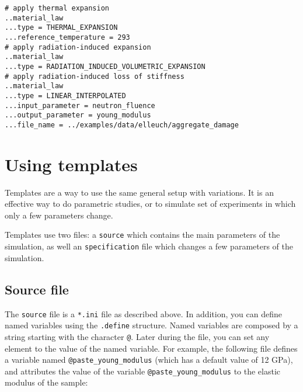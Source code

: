 \documentclass[10pt]{article}
\begin{document}
\verb+# apply thermal expansion+\\
\verb+..material_law+\\
\verb+...type = THERMAL_EXPANSION+\\
\verb+...reference_temperature = 293+\\
\verb+# apply radiation-induced expansion+\\
\verb+..material_law+\\
\verb+...type = RADIATION_INDUCED_VOLUMETRIC_EXPANSION+\\
\verb+# apply radiation-induced loss of stiffness+\\
\verb+..material_law+\\
\verb+...type = LINEAR_INTERPOLATED+\\
\verb+...input_parameter = neutron_fluence+\\
\verb+...output_parameter = young_modulus+\\
\verb+...file_name = ../examples/data/elleuch/aggregate_damage+\\

\section{Using templates}

Templates are a way to use the same general setup with variations. It is an effective way to do parametric studies, or to simulate set of experiments in which only a few parameters change.

Templates use two files: a \verb+source+ which contains the main parameters of the simulation, as well an \verb+specification+ file which changes a few parameters of the simulation.

\subsection{Source file}

The \verb+source+ file is a \verb+*.ini+ file as described above. In addition, you can define named variables using the \verb+.define+ structure. Named variables are composed by a string starting with the character \verb+@+. Later during the file, you can set any element to the value of the named variable. For example, the following file defines a variable named \verb+@paste_young_modulus+ (which has a default value of 12 GPa), and attributes the value of the variable \verb+@paste_young_modulus+ to the elastic modulus of the sample:\\
\end{document}
